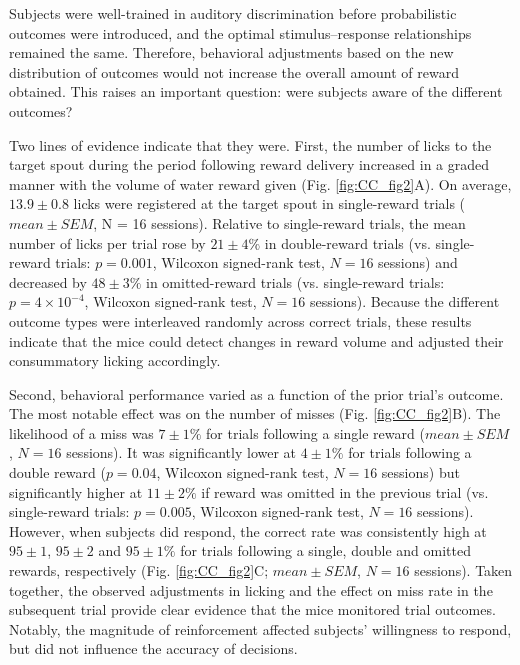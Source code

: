 Subjects were well-trained in auditory discrimination before probabilistic outcomes were introduced, and the optimal stimulus–response relationships remained the same. Therefore, behavioral adjustments based on the new distribution of outcomes would not increase the overall amount of reward obtained. This raises an important question: were subjects aware of the different outcomes? 

Two lines of evidence indicate that they were. First, the number of licks to the target spout during the period following reward delivery increased in a graded manner with the volume of water reward given (Fig. \ref{fig:CC_fig2}A). On average, $13.9 \pm 0.8$ licks were registered at the target spout in single-reward trials ($mean \pm SEM$, N = 16 sessions). Relative to single-reward trials, the mean number of licks per trial rose by $21 \pm 4\%$ in double-reward trials (vs. single-reward trials: $p = 0.001$, Wilcoxon signed-rank test, $N = 16$ sessions) and decreased by $48 \pm 3\%$ in omitted-reward trials (vs. single-reward trials: $p = 4 \times 10^{-4}$, Wilcoxon signed-rank test, $N = 16$ sessions). Because the different outcome types were interleaved randomly across correct trials, these results indicate that the mice could detect changes in reward volume and adjusted their consummatory licking accordingly.



Second, behavioral performance varied as a function of the prior trial’s outcome. The most notable effect was on the number of misses (Fig. \ref{fig:CC_fig2}B). The likelihood of a miss was $7 \pm 1\%$ for trials following a single reward ($mean \pm SEM$, $N = 16$ sessions). It was significantly lower at $4 \pm 1\%$ for trials following a double reward ($p = 0.04$, Wilcoxon signed-rank test, $N = 16$ sessions) but significantly higher at $11 \pm 2\%$ if reward was omitted in the previous trial (vs. single-reward trials: $p = 0.005$, Wilcoxon signed-rank test, $N = 16$ sessions). However, when subjects did respond, the correct rate was consistently high at $95 \pm 1$, $95 \pm 2$ and $95 \pm 1\%$ for trials following a single, double and omitted rewards, respectively (Fig. \ref{fig:CC_fig2}C; $mean \pm SEM$, $N = 16$ sessions). Taken together, the observed adjustments in licking and the effect on miss rate in the subsequent trial provide clear evidence that the mice monitored trial outcomes. Notably, the magnitude of reinforcement affected subjects’ willingness to respond, but did not influence the accuracy of decisions.

